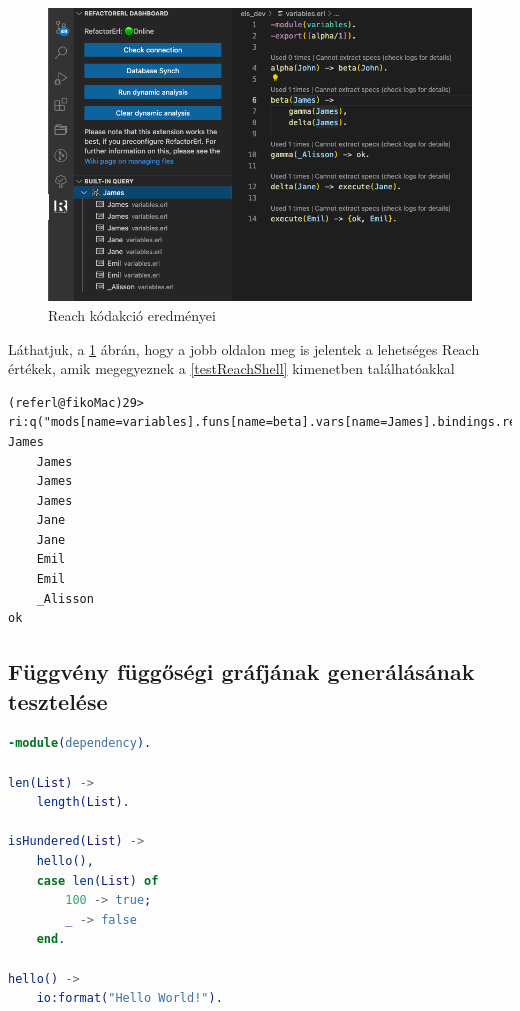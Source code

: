 \begin{figure}[H]
  \centering
  \includegraphics[width=0.9\linewidth]{images/testCases/testVarReach.png}
  \caption{Reach kódakció eredményei}
  \label{fig:testVarReach}
\end{figure}


Láthatjuk, a \ref{fig:testVarReach} ábrán, hogy a jobb oldalon meg is jelentek a lehetséges Reach értékek, amik megegyeznek a \ref{testReachShell} kimenetben találhatóakkal


\lstset{caption=Válltozó Origin értéke Shellből, label=src:shell} \label{testReachShell}
\begin{lstlisting}[language={shell}]  
(referl@fikoMac)29> ri:q("mods[name=variables].funs[name=beta].vars[name=James].bindings.reach"). 
James
    James
    James
    James
    Jane
    Jane
    Emil
    Emil
    _Alisson
ok
\end{lstlisting}


\subsection{Függvény függőségi gráfjának generálásának tesztelése}

 \label{testdependencyERL}
\begin{lstlisting}[language={erlang}]  
-module(dependency).

len(List) ->
    length(List).

isHundered(List) ->
    hello(),
    case len(List) of
        100 -> true;
        _ -> false
    end.

hello() ->
    io:format("Hello World!").
\end{lstlisting}

